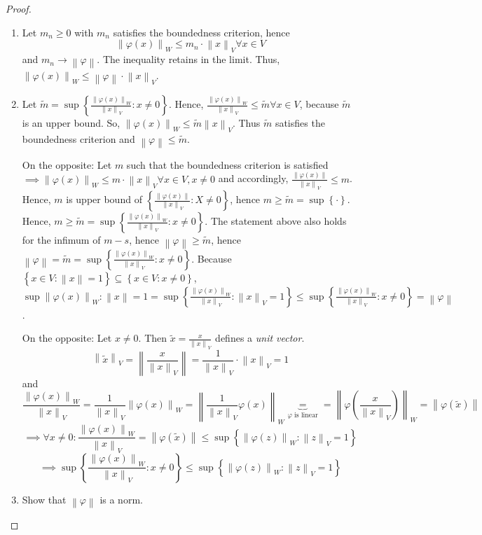 \documentclass{article}
\newcommand{\set}[1]{\left\{#1\right\}}
\newcommand{\norm}[1]{\left\|#1\right\|}
\begin{document}
\begin{proof}
  \begin{enumerate}
    \item Let $m_n \geq 0$ with $m_n$ satisfies the boundedness criterion, hence
      \[ \norm{\varphi(x)}_W \leq m_n \cdot \norm{x}_V \forall x \in V \]
      and $m_n \to \norm{\varphi}$.
      The inequality retains in the limit. Thus, $\norm{\varphi(x)}_W \leq \norm{\varphi} \cdot \norm{x}_V$.
    \item Let $\tilde m = \sup\set{\frac{\norm{\varphi(x)}_W}{\norm{x}_V}: x \neq 0}$.
      Hence, $\frac{\norm{\varphi(x)}_W}{\norm{x}_V} \leq \tilde m \forall x \in V$, because $\tilde m$ is an upper bound.
      So, $\norm{\varphi(x)}_W \leq \tilde m \norm{x}_V$. Thus $\tilde m$ satisfies the boundedness criterion and $\norm{\varphi} \leq \tilde m$.

      On the opposite: Let $m$ such that the boundedness criterion is satisfied $\implies \norm{\varphi(x)}_W \leq m \cdot \norm{x}_V \forall x \in V, x \neq 0$
      and accordingly, $\frac{\norm{\varphi(x)}}{\norm{x}_V} \leq m$.
      Hence, $m$ is upper bound of $\set{\frac{\norm{\varphi(x)}}{\norm{x}_V} : X \neq 0}$, hence $m \geq \tilde m = \sup\set{\cdot}$.
      Hence, $m \geq \tilde m = \sup\set{\frac{\norm{\varphi(x)}_W}{\norm{x}_V}: x \neq 0}$.
      The statement above also holds for the infimum of $m-s$, hence $\norm{\varphi} \geq \tilde m$,
      hence $\norm{\varphi} = \tilde m = \sup\set{\frac{\norm{\varphi(x)}_W}{\norm{x}_V}: x \neq 0}$.
      Because $\set{x \in V: \norm{x} = 1} \subseteq \set{x \in V: x \neq 0}$,
      $\sup{\norm{\varphi(x)}_W: \norm{x} = 1} = \sup{\set{\frac{\norm{\varphi(x)}_W}{\norm{x}_V} : \norm{x}_V = 1}} \leq \sup\set{\frac{\norm{\varphi(x)}_W}{\norm{x}_V} : x \neq 0} = \norm{\varphi}$.

      On the opposite: Let $x \neq 0$. Then $\tilde x = \frac{x}{\norm{x}_V}$ defines a \emph{unit vector}.
      \[ \norm{\tilde x}_V = \norm{\frac{x}{\norm{x}_V}} = \frac{1}{\norm{x}_V} \cdot \norm{x}_V = 1 \]
      and
      \[ \frac{\norm{\varphi(x)}_W}{\norm{x}_V} = \frac{1}{\norm{x}_V} \norm{\varphi(x)}_W = \norm{\frac{1}{\norm{x}_V} \varphi(x)}_W \underbrace{=}_{\varphi \text{ is linear}} = \norm{\varphi(\frac{x}{\norm{x}_V})}_W = \norm{\varphi(\tilde x)} \]
      \[ \implies \forall x \neq 0: \frac{\norm{\varphi(x)}_W}{\norm{x}_V} = \norm{\varphi(\tilde x)} \leq \sup\set{\norm{\varphi(z)}_W: \norm{z}_V = 1} \]
      \[ \implies \sup\set{\frac{\norm{\varphi(x)}_W}{\norm{x}_V}: x \neq 0} \leq \sup\set{\norm{\varphi(z)}_W: \norm{z}_V = 1} \]
    \item Show that $\norm{\varphi}$ is a norm.


\end{enumerate}
\end{proof}
\end{document}

